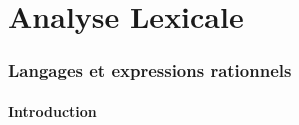 \part{Analyse Lexicale}
 
 
\section{Langages et expressions rationnels}
 
\subsection{Introduction}
%
%
%
 
%
%
%
% 
%
%
%
%
% 
%
%
% 
% 
%
%
%
%
% 
